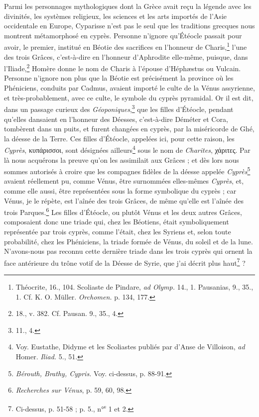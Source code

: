 \documentclass{article}
\begin{document}
Parmi les personnages mythologiques dont la Grèce avait reçu la légende avec les divinités, les systèmes religieux, les sciences et les arts importés de l'Asie occidentale en Europe, Cyparisse n'est pas le seul que les traditions grecques nous montrent métamorphosé en cyprès. Personne n'ignore qu'Étéocle passait pour avoir, le premier, institué en Béotie des sacrifices en l'honneur de Charis,\footnote{Théocrite, 16., 104. Scoliaste de Pindare, \emph{ad Olymp.} 14., 1. Pausanias, 9., 35., 1. Cf. K. O. Müller. \emph{Orchomen.} p. 134, 177.} l'une des trois Grâces, c'est-à-dire en l'honneur d'Aphrodite elle-même, puisque, dans l'Iliade,\footnote{18., v. 382. Cf. Pausan. 9., 35., 4.} Homère donne le nom de Charis à l'épouse d'Héphæstus ou Vulcain. Personne n'ignore non plus que la Béotie est précisément la province où les Phéniciens, conduits par Cadmus, avaient importé le culte de la Vénus assyrienne, et très-probablement, avec ce culte, le symbole du cyprès pyramidal. Or il est dit, dans un passage curieux des \emph{Géoponiques},\footnote{11., 4.} que les filles d'Étéocle, pendant qu'elles dansaient en l'honneur des Déesses, c'est-à-dire Déméter et Cora, tombèrent dans un puits, et furent changées en cyprès, par la miséricorde de Ghé, la déesse de la Terre. Ces filles d'Étéocle, appelées ici, pour cette raison, les \emph{Cyprès}, \textgreek{κυπάρισσοι}, sont désignées ailleurs\footnote{Voy. Eustathe, Didyme et les Scoliastes publiés par d'Anse de Villoison, \emph{ad} Homer. \emph{Iliad.} 5., 51.} sous le nom de \emph{Charites}, \textgreek{χάριτες}. Par là nous acquérons la preuve qu'on les assimilait aux Grâces ; et dès lors nous sommes autorisés à croire que les compagnes fidèles de la déesse appelée \emph{Cyprès}\footnote{\emph{Bérouth, Brathy, Cypris.} Voy. ci-dessus, p. 88-91.} avaient réellement pu, comme Vénus, être surnommées elles-mêmes \emph{Cyprès}, et, comme elle aussi, être représentées sous la forme symbolique du cyprès ; car Vénus, je le répète, est l'aînée des trois Grâces, de même qu'elle est l'aînée des trois Parques.\footnote{\emph{Recherches sur Vénus}, p. 59, 60, 98.} Les filles d'Étéocle, ou plutôt Vénus et les deux autres Grâces, composaient donc une triade qui, chez les Béotiens, était symboliquement représentée par trois cyprès, comme l'était, chez les Syriens et, selon toute probabilité, chez les Phéniciens, la triade formée de Vénus, du soleil et de la lune. N'avons-nous pas reconnu cette dernière triade dans les trois cyprès qui ornent la face antérieure du trône votif de la Déesse de Syrie, que j'ai décrit plus haut\footnote{Ci-dessus, p. 51-58 ; p. 5., n°\textsuperscript{s} 1 et 2.} ?
\end{document}
